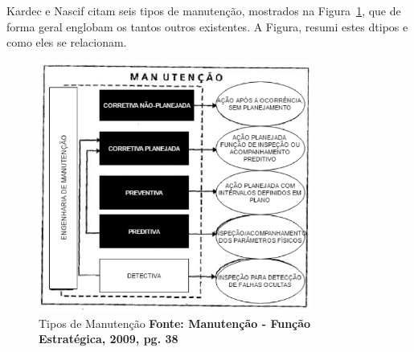 Kardec e Nascif citam seis tipos de manutenção, mostrados na Figura~\ref{tiposmanutencao}, que de forma geral englobam os tantos outros existentes. A Figura, resumi estes dtipos e como eles se relacionam.

\graphicspath{{figuras/}}
\begin{figure}[h]
\centering
\includegraphics[width=0.8\textwidth]{tipos-de-manutencao}
\caption{Tipos de Manutenção \textbf{Fonte: Manutenção - Função Estratégica, 2009, pg. 38}}
\label{tiposmanutencao}
\end{figure}




